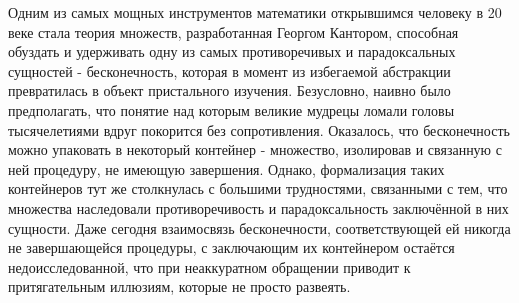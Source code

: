 \documentclass[12pt]{article}
\begin{document}

Одним из самых мощных инструментов математики открывшимся человеку в 20 веке стала теория множеств, разработанная Георгом Кантором, способная обуздать и удерживать одну из самых противоречивых и парадоксальных сущностей - бесконечность, которая в момент из избегаемой абстракции превратилась в объект пристального изучения. Безусловно, наивно было предполагать, что понятие над которым великие мудрецы ломали головы тысячелетиями вдруг покорится без сопротивления. Оказалось, что бесконечность можно упаковать в некоторый контейнер - множество, изолировав и связанную с ней процедуру, не имеющую завершения. Однако, формализация таких контейнеров тут же столкнулась с большими трудностями, связанными с тем, что множества наследовали противоречивость и парадоксальность заключённой в них сущности. Даже сегодня взаимосвязь бесконечности, соответствующей ей никогда не завершающейся процедуры, с заключающим их контейнером остаётся недоисследованной, что при неаккуратном обращении приводит к притягательным иллюзиям, которые не просто развеять.
\end{document}
